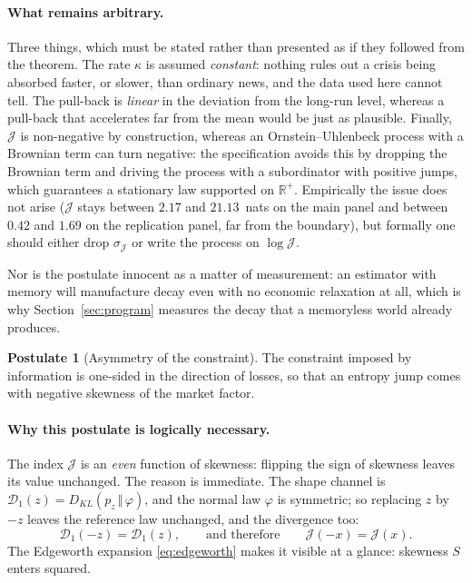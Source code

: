 \documentclass[11pt]{article}
\theoremstyle{definition}
\newtheorem{postulate}{Postulate}
\theoremstyle{remark}
\newcommand{\JJ}{\mathcal{J}}
\newcommand{\Dun}{\mathcal{D}_1}
\newcommand{\KL}[2]{D_{KL}\!\left(#1\,\Vert\,#2\right)}
\begin{document}
\paragraph{What remains arbitrary.} Three things, which must be stated rather
than presented as if they followed from the theorem. The rate $\kappa$ is
assumed \emph{constant}: nothing rules out a crisis being absorbed faster, or
slower, than ordinary news, and the data used here cannot tell. The pull-back is
\emph{linear} in the deviation from the long-run level, whereas a pull-back that
accelerates far from the mean would be just as plausible. Finally, $\JJ$ is
non-negative by construction, whereas an Ornstein--Uhlenbeck process with a
Brownian term can turn negative: the \citet{bns2001} specification avoids this
by dropping the Brownian term and driving the process with a subordinator with
positive jumps, which guarantees a stationary law supported on $\mathbb{R}^+$.
Empirically the issue does not arise ($\JJ$ stays between $2.17$ and
$21.13$~nats on the main panel and between $0.42$ and $1.69$ on the replication
panel, far from the boundary), but formally one should either drop
$\sigma_\JJ$ or write the process on $\log\JJ$.

Nor is the postulate innocent as a matter of measurement: an estimator with
memory will manufacture decay even with no economic relaxation at all, which is
why Section~\ref{sec:program} measures the decay that a memoryless world already
produces.

\begin{postulate}[Asymmetry of the constraint]
\label{p:sign}
The constraint imposed by information is one-sided in the direction of losses,
so that an entropy jump comes with negative skewness of the market factor.
\end{postulate}

\paragraph{Why this postulate is logically necessary.} The index $\JJ$ is an
\emph{even} function of skewness: flipping the sign of skewness leaves its value
unchanged. The reason is immediate. The shape channel is
$\Dun(z)=\KL{p_z}{\varphi}$, and the normal law $\varphi$ is symmetric; so
replacing $z$ by $-z$ leaves the reference law unchanged, and the divergence too:
\begin{equation}
\label{eq:even}
\Dun(-z)=\Dun(z),\qquad\text{and therefore}\qquad \JJ(-x)=\JJ(x).
\end{equation}
The Edgeworth expansion \eqref{eq:edgeworth} makes it visible at a glance:
skewness $S$ enters squared.
\end{document}
